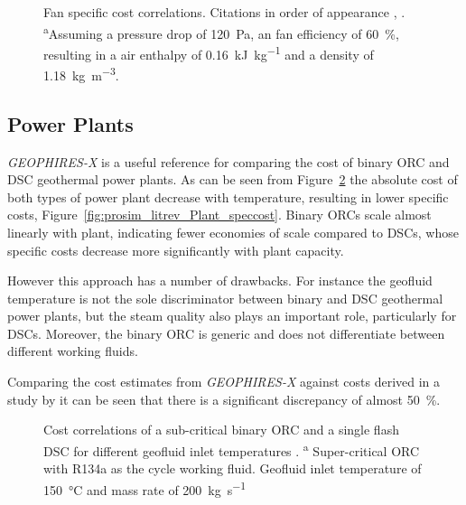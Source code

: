         \begin{figure}[H]
            \centering
            
            \caption{Fan specific cost correlations. Citations in order of appearance \cite{Turton2012}, \cite{Smith2005}. \textsuperscript{a}Assuming a pressure drop of \qty{120}{\Pa}, an fan efficiency of \qty{60}{\percent}, resulting in a air enthalpy of \qty{0.16}{\kilo\joule\per\kg} and a density of \qty{1.18}{\kg\per\m\cubed}.}
            \label{fig:prosim_litrev_Fan_speccost}
        \end{figure}

    \subsection{Power Plants}
        \label{sec:prosim_litrev_plant_cost}
        \emph{GEOPHIRES-X}\cite{Beckers2023} is a useful reference for comparing the cost of binary \ac{ORC} and \ac{DSC} geothermal power plants. As can be seen from  Figure~\ref{fig:prosim_litrev_Plant_cost} the absolute cost of both types of power plant decrease with temperature, resulting in lower specific costs, Figure~\ref{fig:prosim_litrev_Plant_speccost}. Binary \ac{ORC}s scale almost linearly with plant, indicating fewer economies of scale compared to \ac{DSC}s, whose specific costs decrease more significantly with plant capacity.

        However this approach has a number of drawbacks. For instance the geofluid temperature is not the sole discriminator between binary and \ac{DSC} geothermal power plants, but the steam quality also plays an important role, particularly for \ac{DSC}s. Moreover, the binary \ac{ORC} is generic and does not differentiate between different working fluids.

        Comparing the cost estimates from \emph{GEOPHIRES-X} against costs derived in a study by \citeauthor{Astolfi2014B} \cite{Astolfi2014B} it can be seen that there is a significant discrepancy of almost \qty{50}{\percent}.
        
        \begin{figure}[H]
            \centering
            
            \caption[Plant cost correlations of a sub-critical binary \ac{ORC} and a single flash \ac{DSC}.]{Cost correlations of a sub-critical binary \ac{ORC} and a single flash \ac{DSC} for different geofluid inlet temperatures \cite{Beckers2019, Ross2023, Beckers2023}. \textsuperscript{a} Super-critical \ac{ORC} with R134a as the cycle working fluid. Geofluid inlet temperature of \qty{150}{\degreeCelsius} and mass rate of \qty{200}{\kg\per\s} \cite{Astolfi2014B}}
            \label{fig:prosim_litrev_Plant_cost}
        \end{figure}


